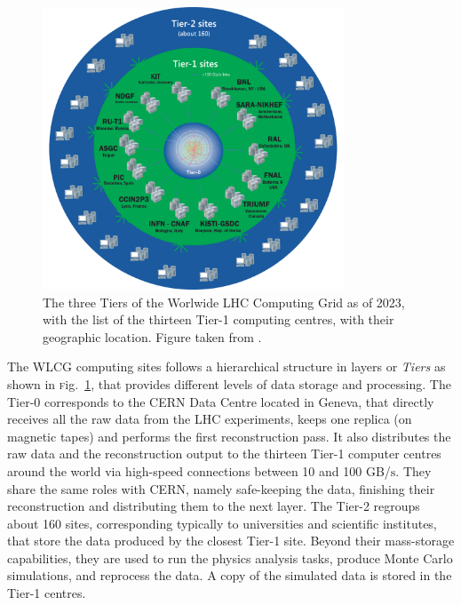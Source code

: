 \documentclass[ALICE,manyauthors]{cernphprep}
\newcommand{\Fig}       {\textsc{f}ig.~}
\newcommand{\fig}       {\Fig}
\newcommand {\unitStyle}[1] {\mbox{\ensuremath{\text{#1}}}}
\newcommand {\second}     {\unitStyle{s}\xspace}
\begin{document}
\begin{figure}[b]
	\centering
	\includegraphics[width=0.8\textwidth]{Figs/Chapter3/WLCG-Tiers-2021_v3_1.png}
	\caption{The three Tiers of the Worlwide LHC Computing Grid as of 2023, with the list of the thirteen Tier-1 computing centres, with their geographic location. Figure taken from \cite{worldwidelhccomputinggridWorldwideLHCComputing}.}
	\label{fig:WLCG}
\end{figure}

The WLCG computing sites follows a hierarchical structure in layers or \textit{Tiers} as shown in \fig\ref{fig:WLCG}, that provides different levels of data storage and processing. The Tier-0 corresponds to the CERN Data Centre located in Geneva, that directly receives all the raw data from the LHC experiments, keeps one replica (on magnetic tapes) and performs the first reconstruction pass. It also distributes the raw data and the reconstruction output to the thirteen Tier-1 computer centres around the world via high-speed connections between 10 and 100 GB/\second. They share the same roles with CERN, namely safe-keeping the data, finishing their reconstruction and distributing them to the next layer. The Tier-2 regroups about 160 sites, corresponding typically to universities and scientific institutes, that store the data produced by the closest Tier-1 site. Beyond their mass-storage capabilities, they are used to run the physics analysis tasks, produce Monte Carlo simulations, and reprocess the data. A copy of the simulated data is stored in the Tier-1 centres.
\end{document}
